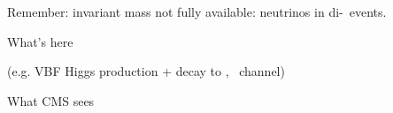 \section*{}
\begin{frame}

\begin{minipage}[t]{.45\textwidth}
\manip Remember: invariant mass not fully available:
\submanip neutrinos in di-\tau\ events.
\pause
\begin{block}{What's here}
\begin{center}
{\small (e.g. VBF Higgs production + decay to \tau\tau, \mu\tauh\ channel)}

\vspace{.5\baselineskip}

\end{center}
\end{block}

\end{minipage}
\hfill
\begin{minipage}[t]{.45\textwidth}
\vspace{-\baselineskip}
\begin{block}{What CMS sees}
\begin{center}
\begin{center}
\end{center}
\end{center}
\end{block}
\end{minipage}
\end{frame}

